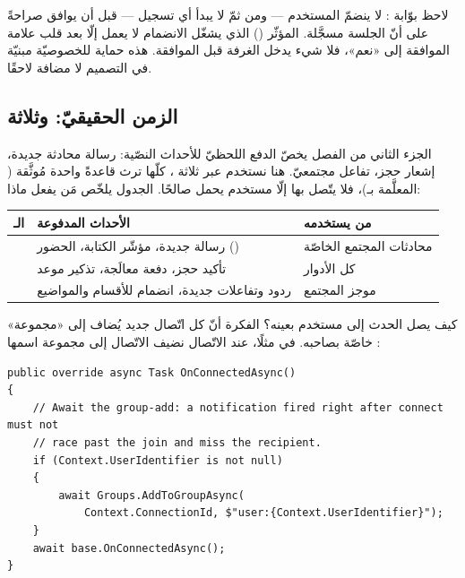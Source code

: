 \begin{secnote}
لاحظ بوّابة : لا ينضمّ المستخدم — ومن ثمّ لا يبدأ أي تسجيل — قبل أن
يوافق صراحةً على أنّ الجلسة مسجَّلة. المؤثّر () الذي يشغّل الانضمام لا
يعمل إلّا بعد قلب علامة الموافقة إلى «نعم»، فلا شيء يدخل الغرفة قبل الموافقة. هذه
حماية للخصوصيّة مبنيّة في التصميم لا مضافة لاحقًا.
\end{secnote}

\subsection{الزمن الحقيقيّ:  وثلاثة }

الجزء الثاني من الفصل يخصّ الدفع اللحظيّ للأحداث النصّية: رسالة محادثة جديدة، إشعار
حجز، تفاعل مجتمعيّ. هنا نستخدم  عبر ثلاثة ، كلّها ترث قاعدةً
واحدة مُوثَّقة ( المعلَّمة بـ\code{[Authorize]})، فلا يتّصل
بها إلّا مستخدم يحمل  صالحًا. الجدول يلخّص مَن يفعل ماذا:

\begin{center}
\begin{tabular}{L{3.0cm} L{6.6cm} L{4.0cm}}
\toprule
\textbf{\color{spPrimary}الـ} & \textbf{\color{spPrimary}الأحداث المدفوعة} & \textbf{\color{spPrimary}من يستخدمه} \\
\midrule
{} & رسالة جديدة، مؤشّر الكتابة، الحضور () & محادثات المجتمع الخاصّة \\
 & تأكيد حجز، دفعة معالَجة، تذكير موعد & كل الأدوار \\
 & ردود وتفاعلات جديدة، انضمام للأقسام والمواضيع & موجز المجتمع \\
\bottomrule
\end{tabular}
\end{center}

كيف يصل الحدث إلى مستخدم بعينه؟ الفكرة أنّ كل اتّصال جديد يُضاف إلى «مجموعة» خاصّة
بصاحبه. في  مثلًا، عند الاتّصال نضيف الاتّصال إلى مجموعة اسمها
:

\begin{english}
\begin{lstlisting}[language={[Sharp]C}]
public override async Task OnConnectedAsync()
{
    // Await the group-add: a notification fired right after connect must not
    // race past the join and miss the recipient.
    if (Context.UserIdentifier is not null)
    {
        await Groups.AddToGroupAsync(
            Context.ConnectionId, $"user:{Context.UserIdentifier}");
    }
    await base.OnConnectedAsync();
}
\end{lstlisting}
\end{english}

